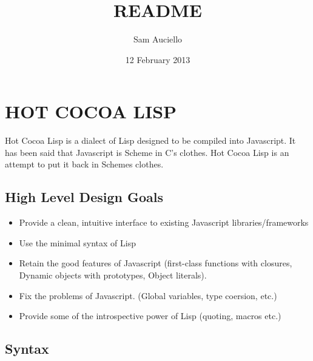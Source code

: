 \documentclass[11pt]{article}
\title{README}
\author{Sam Auciello}
\date{12 February 2013}
\begin{document}
\maketitle

\setcounter{tocdepth}{3}
\tableofcontents
\vspace*{1cm}
\section{HOT COCOA LISP}
\label{sec-1}

  Hot Cocoa Lisp is a dialect of Lisp designed to be compiled into
  Javascript.  It has been said that Javascript is Scheme in C's
  clothes.  Hot Cocoa Lisp is an attempt to put it back in Schemes
  clothes.
\subsection{High Level Design Goals}
\label{sec-1.1}

\begin{itemize}
\item Provide a clean, intuitive interface to existing
     Javascript libraries/frameworks
\item Use the minimal syntax of Lisp
\item Retain the good features of Javascript
     (first-class functions with closures, Dynamic objects with prototypes,
     Object literals).
\item Fix the problems of Javascript.
     (Global variables, type coersion, etc.)
\item Provide some of the introspective power of Lisp (quoting, macros etc.)
\end{itemize}
   
\subsection{Syntax}
\label{sec-1.2}
\end{document}
